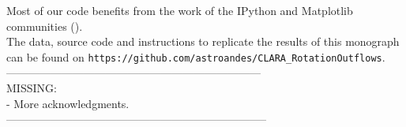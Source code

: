 Most of our code benefits from the work of the IPython and Matplotlib communities (\cite{IPython,matplotlib}).\\

The data, source code and instructions to replicate the results of this monograph can be found on \texttt{https://github.com/astroandes/CLARA\_RotationOutflows}. \\


---------------------------------------------------------------------\\
MISSING: \\
- More acknowledgments.\\
-----------------------------------------------------------------------\\

\tableofcontents
\clearpage